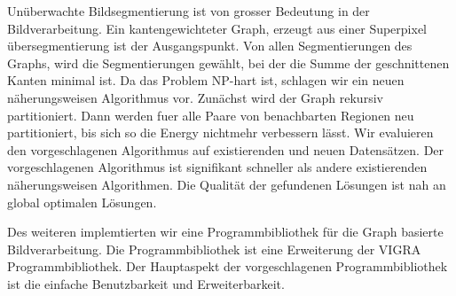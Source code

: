 Un\"uberwachte Bildsegmentierung 
ist von grosser Bedeutung in der Bildverarbeitung.
Ein kantengewichteter Graph, erzeugt aus einer
Superpixel \"ubersegmentierung  ist der Ausgangspunkt.
Von allen Segmentierungen des Graphs, 
wird die Segmentierungen gew\"ahlt,
bei der die Summe der geschnittenen Kanten 
minimal ist.
Da das Problem NP-hart ist, schlagen wir 
ein neuen n\"aherungsweisen Algorithmus vor.
Zun\"achst wird der Graph rekursiv partitioniert.
Dann werden fuer alle Paare von benachbarten
Regionen neu partitioniert,
bis sich so die Energy nichtmehr verbessern l\"asst.
Wir evaluieren den vorgeschlagenen Algorithmus
auf existierenden und neuen Datens\"atzen.
Der vorgeschlagenen Algorithmus 
ist signifikant schneller als 
andere existierenden  n\"aherungsweisen Algorithmen.
Die Qualit\"at der gefundenen L\"osungen 
ist nah an global optimalen L\"osungen.


Des weiteren implemtierten wir eine 
Programmbibliothek f\"ur  die Graph basierte  Bildverarbeitung.
Die Programmbibliothek ist eine Erweiterung der VIGRA Programmbibliothek.
Der Hauptaspekt der vorgeschlagenen Programmbibliothek
ist die einfache Benutzbarkeit und Erweiterbarkeit.




\endgroup           

\vfill
